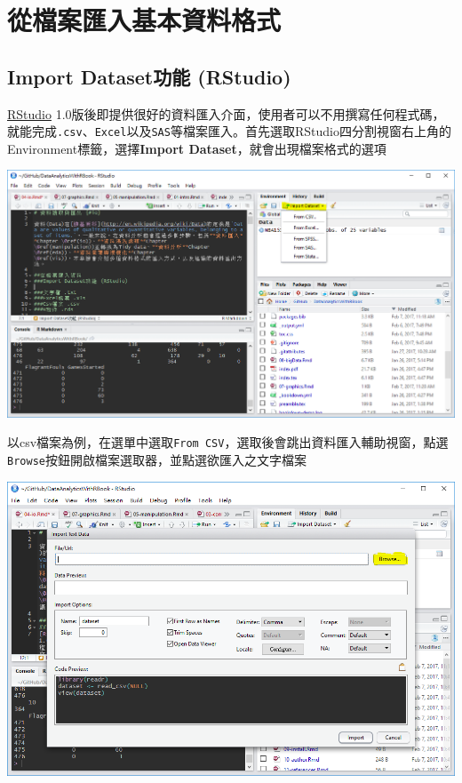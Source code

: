 \documentclass[]{book}
\theoremstyle{definition}
\theoremstyle{definition}
\theoremstyle{remark}
\begin{document}
\section{從檔案匯入基本資料格式}\label{file}

\subsection{Import Dataset功能 (RStudio)}\label{import-dataset-rstudio}

\href{https://www.rstudio.com/}{RStudio}
1.0版後即提供很好的資料匯入介面，使用者可以不用撰寫任何程式碼，就能完成\texttt{.csv}、\texttt{Excel}以及\texttt{SAS}等檔案匯入。首先選取RStudio四分割視窗右上角的Environment標籤，選擇\textbf{Import
Dataset}，就會出現檔案格式的選項

\includegraphics[width=16.43in]{figure/import}

以csv檔案為例，在選單中選取\texttt{From\ CSV}，選取後會跳出資料匯入輔助視窗，點選\texttt{Browse}按鈕開啟檔案選取器，並點選欲匯入之文字檔案

\includegraphics[width=13.81in]{figure/csv}
\end{document}
